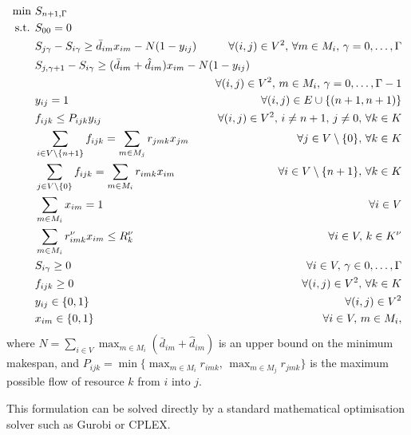 \documentclass[a4paper,abstracton]{scrartcl}
\begin{document}
\begin{align}
\min \ & S_{n+1,\Gamma}\label{eqn:compact1}\\
\text{s.t. } & S_{00}=0\label{eqn:compact2}\\
	     & S_{j\gamma} - S_{i\gamma} \geq \bar{d}_{im}x_{im} - N(1-y_{ij}) & \hspace{-5cm}\forall (i,j)\in V^2,\,\forall m\in M_i,\,\gamma=0,\dots,\Gamma\label{eqn:compact_bigM1}\\
	     & S_{j,\gamma+1} - S_{i\gamma} \geq (\bar{d}_{im} + \hat{d}_{im})x_{im} - N(1-y_{ij})\nonumber \\
	     &&\hspace{-5cm} \forall (i,j)\in V^2,\, m\in M_i,\,\gamma = 0,\dots,\Gamma-1\label{eqn:compact_bigM2}\\
	     & y_{ij}=1 & \forall (i,j) \in E\cup\{(n+1,n+1)\}\label{eqn:compact5}\\
	     & f_{ijk}\leq P_{ijk}y_{ij} & \hspace{-5cm}\forall (i,j)\in V^2,\,i\neq n+1,\,j\neq0,\, \forall k \in K\label{eqn:compact6}\\
	     & \sum_{i\in V\setminus\{n+1\}}f_{ijk}=\sum_{m\in M_j}r_{jmk}x_{jm} & \forall j \in V\setminus\{0\} ,\, \forall k\in K\label{eqn:compact7}\\
	     & \sum_{j\in V\setminus\{0\}}f_{ijk}=\sum_{m\in M_i}r_{imk}x_{im} & \forall i \in V\setminus\{n+1\},\,\forall k\in K\label{eqn:compact8}\\
	     & \sum_{m\in M_i}x_{im} = 1 & \forall i\in V\label{eqn:compact9}\\
	     & \sum_{m\in M_i}r^{\nu}_{imk}x_{im} \leq R^{\nu}_k & \forall i \in V,\,k\in K^{\nu}\\
	     & S_{i\gamma}\geq 0 &\forall i\in V,\,\gamma \in 0,\dots, \Gamma\label{eqn:compact10}\\
	     & f_{ijk}\geq 0 & \forall (i,j)\in V^2 ,\, \forall k \in K\label{eqn:compact11}\\
	     & y_{ij}\in\{0,1\} & \forall (i,j)\in V^2\label{eqn:compact12}\\
	     & x_{im}\in\{0,1\} & \forall i\in V,\,m\in M_i,
\end{align}
where $N=\sum_{i\in V}\max_{m\in M_i}(\bar{d}_{im}+\hat{d}_{im})$ is an upper bound on the minimum makespan, and $P_{ijk}=\min\{\max_{m\in M_i}r_{imk},\,\max_{m\in M_j} r_{jmk}\}$ is the maximum possible flow of resource $k$ from $i$ into $j$.

This formulation can be solved directly by a standard mathematical optimisation solver such as Gurobi or CPLEX.
\end{document}
